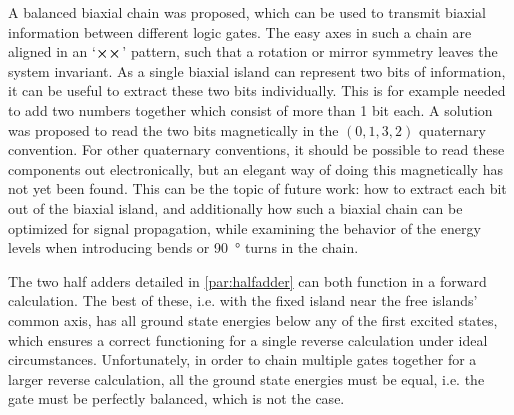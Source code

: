 \documentclass[11pt,a4paper,english]{article}
\begin{document}
A balanced biaxial chain was proposed, which can be used to transmit biaxial information between different logic gates. The easy axes in such a chain are aligned in an `$\cross \cross$' pattern, such that a rotation or mirror symmetry leaves the system invariant. As a single biaxial island can represent two bits of information, it can be useful to extract these two bits individually. This is for example needed to add two numbers together which consist of more than 1 bit each. A solution was proposed to read the two bits magnetically in the $(0,1,3,2)$ quaternary convention. For other quaternary conventions, it should be possible to read these components out electronically, but an elegant way of doing this magnetically has not yet been found. This can be the topic of future work: how to extract each bit out of the biaxial island, and additionally how such a biaxial chain can be optimized for signal propagation, while examining the behavior of the energy levels when introducing bends or \SI{90}{\degree} turns in the chain. \par
The two half adders detailed in \cref{par:halfadder} can both function in a forward calculation. The best of these, i.e. with the fixed island near the free islands' common axis, has all ground state energies below any of the first excited states, which ensures a correct functioning for a single reverse calculation under ideal circumstances. Unfortunately, in order to chain multiple gates together for a larger reverse calculation, all the ground state energies must be equal, i.e. the gate must be perfectly balanced, which is not the case. \par
\end{document}
